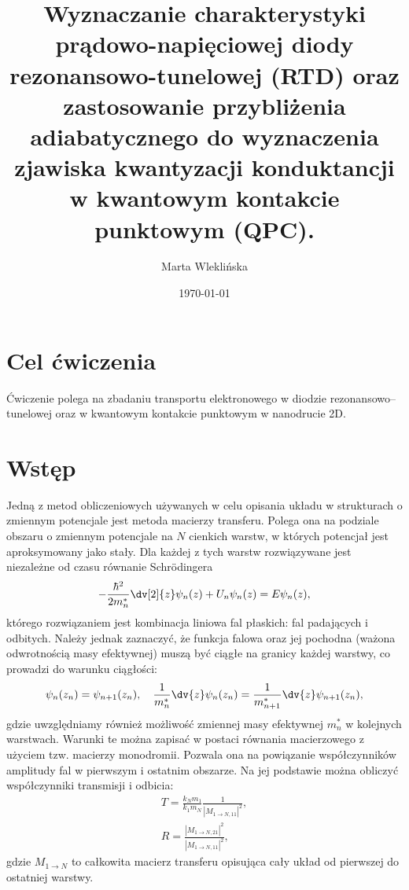 \documentclass{article}
\title{Wyznaczanie charakterystyki prądowo-napięciowej diody
rezonansowo-tunelowej (RTD) oraz zastosowanie przybliżenia
adiabatycznego do wyznaczenia zjawiska kwantyzacji konduktancji
w kwantowym kontakcie punktowym (QPC).}
\author{Marta Wleklińska}
\date{\today}
\begin{document}
\maketitle

\section{Cel ćwiczenia}
Ćwiczenie polega na zbadaniu transportu elektronowego w diodzie rezonansowo--tunelowej oraz w kwantowym kontakcie punktowym w nanodrucie 2D.
\section{Wstęp}
Jedną z metod obliczeniowych używanych w celu opisania układu w strukturach o zmiennym potencjale jest metoda macierzy transferu. 
Polega ona na podziale obszaru o zmiennym potencjale na $N$ cienkich warstw, w których potencjał jest aproksymowany jako stały.
Dla każdej z tych warstw rozwiązywane jest niezależne od czasu równanie Schr{\"o}dingera
\begin{equation}
    -\frac{\hbar^2}{2m^*_n}\dv[2]{z}\psi_n(z)
 + U_n \psi_n(z) = E\psi_n(z),
 \end{equation}
 którego rozwiązaniem jest kombinacja liniowa fal płaskich: fal padających i odbitych. 
 Należy jednak zaznaczyć, że funkcja falowa oraz jej pochodna (ważona odwrotnością masy efektywnej) muszą być ciągłe na granicy każdej warstwy, co prowadzi do warunku ciągłości:
 \begin{equation}
     \psi_n(z_n) = \psi_{n+1}(z_n), \quad
     \frac{1}{m_n^*}\dv{z}\psi_n(z_n) = \frac{1}{m^*_{n+1}}\dv{z}\psi_{n+1}(z_n),
 \end{equation}
 gdzie uwzględniamy również możliwość zmiennej masy efektywnej $m^*_n$ w kolejnych warstwach.
Warunki te można zapisać w postaci równania macierzowego z użyciem tzw. macierzy monodromii. 
Pozwala ona na powiązanie współczynników amplitudy fal w pierwszym i ostatnim obszarze. 
Na jej podstawie można obliczyć współczynniki transmisji i odbicia:
\begin{align}
     T = \frac{k_N m_1}{k_1 m_N}\frac{1}{|M_{1\rightarrow N, 11}|^2},\label{eq:trans}\\
     R = \frac{|M_{1\rightarrow N, 21}|^2}{|M_{1\rightarrow N, 11}|^2}, \label{eq:refl}
 \end{align}
gdzie $M_{1\rightarrow N}$ to całkowita macierz transferu opisująca cały układ od pierwszej do ostatniej warstwy.
\end{document}
